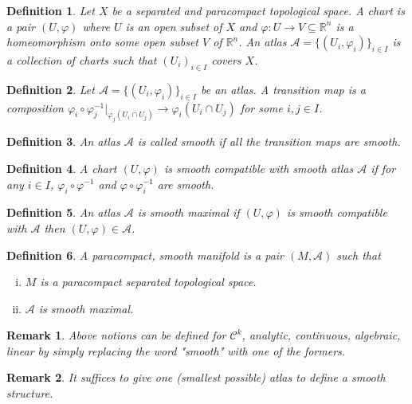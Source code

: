 \documentclass[10pt]{article}
\newtheorem{definition}{Definition}[section]
\newtheorem{remark}{Remark}[section]
\newcommand{\R}[0]{\mathbb{R}}
\begin{document}
\begin{definition}
Let $X$ be a separated and paracompact topological space. A chart is a pair $(U,\varphi)$ where $U$ is an open subset of $X$ and $\varphi:U\to V\subseteq\R^n$ is a homeomorphism onto some open subset $V$ of $\R^n$. An atlas $\mathcal{A}=\{(U_i,\varphi_i)\}_{i\in I}$ is a collection of charts such that $(U_i)_{i\in I}$ covers $X$.
\end{definition}

\begin{definition}
Let $\mathcal{A} = \{(U_i,\varphi_i)\}_{i\in I}$ be an atlas. A transition map is a composition $\varphi_i\circ\varphi_j^{-1}|_{\varphi_j(U_i\cap U_j)}\to\varphi_i(U_i\cap U_j)$ for some $i,j\in I$. 
\end{definition}

\begin{definition}
An atlas $\mathcal{A}$ is called smooth if all the transition maps are smooth.
\end{definition}

\begin{definition}
A chart $(U,\varphi)$ is smooth compatible with smooth atlas $\mathcal{A}$ if for any $i\in I$, $\varphi_i\circ\varphi^{-1}$ and $\varphi\circ\varphi_i^{-1}$ are smooth.
\end{definition}

\begin{definition}
An atlas $\mathcal{A}$ is smooth maximal if $(U,\varphi)$ is smooth compatible with $\mathcal{A}$ then $(U,\varphi)\in\mathcal{A}$.
\end{definition}

\begin{definition}
A paracompact, smooth manifold is a pair $(M,\mathcal{A})$ such that 
\begin{enumerate}[i).]
\item $M$ is a paracompact separated topological space.
\item $\mathcal{A}$ is smooth maximal.
\end{enumerate}
\end{definition}

\begin{remark}
Above notions can be defined for $\mathcal{C}^k$, analytic, continuous, algebraic, linear by simply replacing the word "smooth" with one of the formers.
\end{remark}

\begin{remark}
It suffices to give one (smallest possible) atlas to define a smooth structure.
\end{remark}
\end{document}
